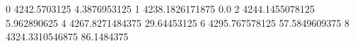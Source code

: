 0 4242.5703125 4.3876953125
1 4238.1826171875 0.0
2 4244.1455078125 5.962890625
4 4267.8271484375 29.64453125
6 4295.767578125 57.5849609375
8 4324.3310546875 86.1484375
